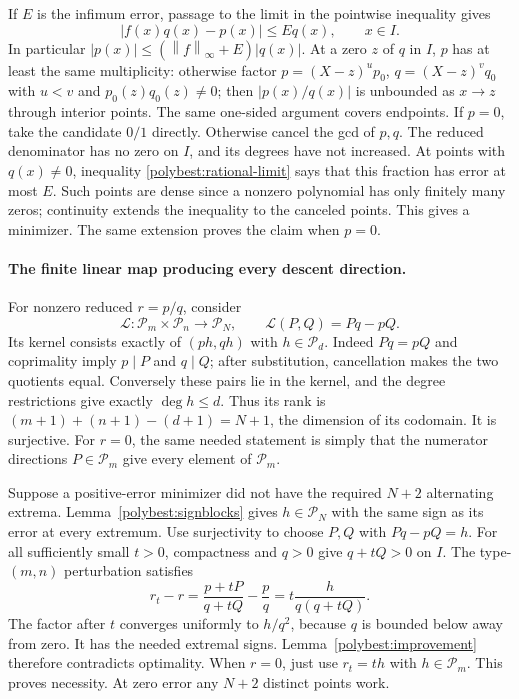 \documentclass[11pt]{article}
\newcommand{\norm}[1]{\left\lVert #1\right\rVert}
\theoremstyle{remark}
\numberwithin{equation}{section}
\begin{document}
If $E$ is the infimum error, passage to the limit in the pointwise
inequality gives
\begin{equation}\label{polybest:rational-limit}
 |f(x)q(x)-p(x)|\le E q(x),\qquad x\in I.
\end{equation}
In particular $|p(x)|\le(\norm f_\infty+E)|q(x)|$.
At a zero $z$ of $q$ in $I$, $p$ has at least the same multiplicity:
otherwise factor $p=(X-z)^u p_0$, $q=(X-z)^v q_0$ with $u<v$ and
$p_0(z)q_0(z)\ne0$; then $|p(x)/q(x)|$ is unbounded as $x\to z$
through interior points.  The same one-sided argument covers endpoints.
If $p=0$, take the candidate $0/1$ directly.  Otherwise cancel the gcd
of $p,q$.  The reduced denominator has no zero on $I$, and its degrees
have not increased.  At points with $q(x)\ne0$, inequality
\eqref{polybest:rational-limit} says that this fraction has error at
most $E$.  Such points are dense since a nonzero polynomial has only
finitely many zeros; continuity extends the inequality to the canceled
points.  This gives a minimizer.  The same extension proves the claim
when $p=0$.

\paragraph{The finite linear map producing every descent direction.}
For nonzero reduced $r=p/q$, consider
\begin{equation}\label{polybest:rational-linear-map}
 \mathcal L:\mathcal P_m\times\mathcal P_n\longrightarrow\mathcal P_N,
 \qquad \mathcal L(P,Q)=Pq-pQ.
\end{equation}
Its kernel consists exactly of $(ph,qh)$ with $h\in\mathcal P_d$.
Indeed $Pq=pQ$ and coprimality imply $p\mid P$ and $q\mid Q$; after
substitution, cancellation makes the two quotients equal.  Conversely
these pairs lie in the kernel, and the degree restrictions give exactly
$\deg h\le d$.  Thus its rank is
$(m+1)+(n+1)-(d+1)=N+1$, the dimension of its codomain.  It is surjective.
For $r=0$, the same needed statement is simply that the numerator
directions $P\in\mathcal P_m$ give every element of $\mathcal P_m$.

Suppose a positive-error minimizer did not have the required $N+2$
alternating extrema.  Lemma~\ref{polybest:signblocks} gives
$h\in\mathcal P_N$ with the same sign as its error at every extremum.
Use surjectivity to choose $P,Q$ with $Pq-pQ=h$.  For all sufficiently
small $t>0$, compactness and $q>0$ give $q+tQ>0$ on $I$.
The type-$(m,n)$ perturbation satisfies
\[
 r_t-r=\frac{p+tP}{q+tQ}-\frac pq
       =t\frac{h}{q(q+tQ)}.
\]
The factor after $t$ converges uniformly to $h/q^2$, because $q$ is
bounded below away from zero.  It has the needed extremal signs.
Lemma~\ref{polybest:improvement} therefore contradicts optimality.
When $r=0$, just use $r_t=th$ with $h\in\mathcal P_m$.
This proves necessity.  At zero error any $N+2$ distinct points work.
\end{document}
